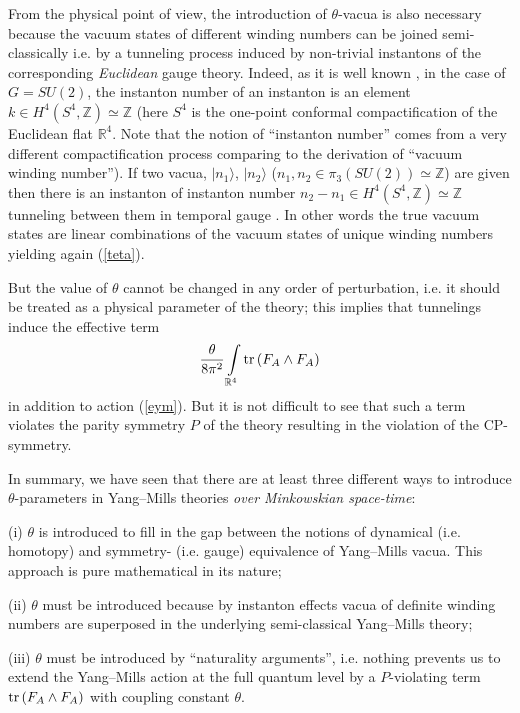 \documentclass[a4paper,12pt,draft]{article}
\newcommand{\Z}{{\mathbb Z}}
\newcommand{\R}{{\mathbb R}}
\newcommand{\tr}{{\rm tr}}
\begin{document}
From the physical point of view, the introduction of $\theta$-vacua is
also necessary because the vacuum states of different winding numbers can
be joined semi-classically i.e. by a tunneling process induced by
non-trivial instantons of the corresponding {\it Euclidean} gauge theory.
Indeed, as it is well known \cite{che}\cite{kak}, in the case
of $G=SU(2)$, the instanton number of an instanton is an element $k\in
H^4(S^4, \Z )\simeq\Z$ (here $S^4$ is the one-point conformal
compactification of the Euclidean flat $\R^4$. Note that the notion of 
``instanton number'' comes from a very different
compactification process comparing to the derivation of ``vacuum winding
number''). If two vacua, $\vert n_1\rangle$, $\vert n_2\rangle$ ($n_1,
n_2\in \pi_3(SU(2))\simeq\Z$) are given then there is an instanton of instanton
number $n_2-n_1\in H^4(S^4,\Z )\simeq\Z$ tunneling between them in
temporal gauge \cite{che}\cite{kak}. In other words the true vacuum
states are linear combinations of the vacuum states of unique winding numbers 
yielding again (\ref{teta}). 

But the value of $\theta$ cannot be changed in any order of perturbation,
i.e. it should be treated as a physical parameter of the theory; this
implies that tunnelings induce the effective term
\[{\theta\over 8\pi^2}\int\limits_{\R^4}\tr\left( F_A\wedge F_A\right)\]
in addition to action (\ref{eym}). But it is not difficult to see that
such a term violates the parity symmetry $P$ of the theory resulting in 
the violation of the CP-symmetry.

In summary, we have seen that there are at least three different ways to
introduce $\theta$-parameters in Yang--Mills theories {\it over
Minkowskian space-time}:

(i) $\theta$ is introduced to fill in the gap between the notions of
dynamical (i.e. homotopy) and symmetry- (i.e. gauge)
equivalence of Yang--Mills vacua. This approach is pure mathematical in
its nature;

(ii) $\theta$ must be introduced because by instanton effects vacua of
definite winding numbers are superposed in the underlying semi-classical
Yang--Mills theory;

(iii) $\theta$ must be introduced by ``naturality arguments'', i.e.
nothing prevents us to extend the Yang--Mills action at the full quantum 
level by a $P$-violating term $\tr\left( F_A\wedge F_A\right)$ with
coupling constant $\theta$.
\end{document}
